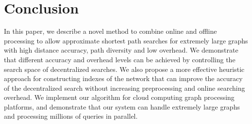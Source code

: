 \section{Conclusion}
\label{conclusion}

In this paper, we describe a novel method to combine online and offline processing to allow approximate shortest path searches for extremely large graphs with high distance accuracy, path diversity and low overhead. We demonstrate that different accuracy and overhead levels can be achieved by controlling the search space of decentralized searches. We also propose a more effective heuristic approach for constructing indexes of the network that can improve the accuracy of the decentralized search without increasing preprocessing and online searching overhead. We implement our algorithm for cloud computing graph processing platforms, and demonstrate that our system can handle extremely large graphs and processing millions of queries in parallel.
